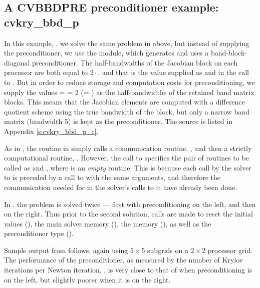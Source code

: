

\subsection{A CVBBDPRE preconditioner example: cvkry\_bbd\_p}\label{ss:cvkry_bbd_p}

In this example, , we solve the same problem in  above,
but instead of supplying the preconditioner, we use the {\cvbbdpre} module,
which generates and uses a band-block-diagonal preconditioner.  The
half-bandwidths of the Jacobian block on each processor are both equal to
$2\cdot$, and that is the value supplied as  and 
in the call to .  But in order to reduce storage and computation
costs for preconditioning, we supply the values  =  = 2
(= ) as the half-bandwidths of the retained band matrix blocks.
This means that the Jacobian elements are computed with a difference quotient
scheme using the true bandwidth of the block, but only a narrow band matrix
(bandwidth 5) is kept as the preconditioner.  The source is listed in
Appendix \ref{s:cvkry_bbd_p_c}. 

As in , the  routine in  simply calls a communication
routine, , and then a strictly computational routine, .  
However, the call to  specifies the pair of routines to
be called as  and , where  is an {\em empty} routine.
This is because each call by the solver to  is preceded by a call
to  with the same  arguments, and therefore the communication
needed for  in the solver's calls to it have already been done.

In , the problem is solved twice --- first with preconditioning
on the left, and then on the right.  Thus prior to the second solution, calls
are made to reset the initial values (), the main solver
memory (), the {\cvbbdpre} memory (),
as well as the preconditioner type ().

Sample output from  follows, again using $5 \times 5$ subgrids 
on a $2 \times 2$ processor grid.  The performance of the preconditioner,
as measured by the number of Krylov iterations per Newton iteration,
, is very close to that of  when preconditioning is on
the left, but slightly poorer when it is on the right.


